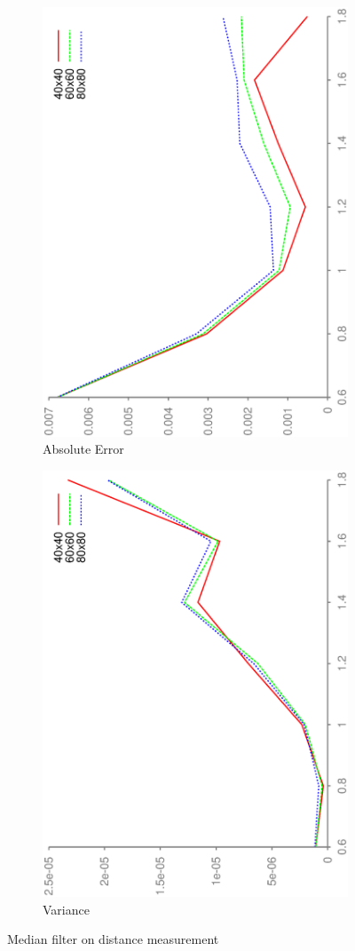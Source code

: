 \documentclass[DIV12,a4paper]{scrartcl}
\begin{document}
\begin{figure}[h!tbp]
  \centering
  \begin{subfigure}[b]{.5\textwidth}
    \centering
    \includegraphics[height=\textwidth, angle=270]{figures/mean_median_error.eps}
    \caption{Absolute Error}
  \end{subfigure}%
  \begin{subfigure}[b]{.5\textwidth}
    \centering
    \includegraphics[height=\textwidth, angle=270]{figures/mean_median_variance.eps}
    \caption{Variance}
  \end{subfigure}
  \caption{Median filter on distance measurement}
  \label{fig:median_noise}
\end{figure}
\end{document}

